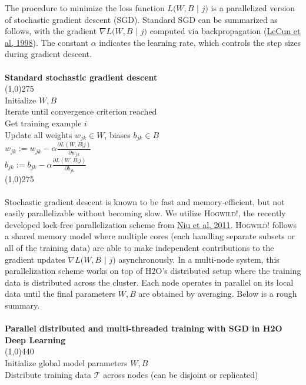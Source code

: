 \documentclass{article}[11pt]
\begin{document}
The procedure to minimize the loss function $L(W,B$ $|$ $j)$ is a parallelized version of stochastic gradient descent (SGD). Standard SGD can be summarized as follows, with the gradient $\nabla L(W,B$ $|$ $j)$ computed via backpropagation (\href{http://yann.lecun.com/exdb/publis/pdf/lecun-98b.pdf}{LeCun et al, 1998}). The constant $\alpha$ indicates the learning rate, which controls the step sizes during gradient descent.
\\
\\
{\bf{\footnotesize{Standard stochastic gradient descent}}}
\\
\line(1,0){275}
\\
Initialize $W,B$ 
\\
Iterate until convergence criterion reached
\\
\indent Get training example $i$
\\
\indent Update all weights $w_{jk} \in W$, biases $b_{jk} \in B$
\\
\indent \indent $w_{jk} := w_{jk} - \alpha \frac{\partial L(W,B | j)}{\partial w_{jk}}$
\\
\indent \indent $b_{jk} := b_{jk} - \alpha \frac{\partial L(W,B | j)}{\partial b_{jk}}$
\\
\line(1,0){275}
\\
\\
Stochastic gradient descent is known to be fast and memory-efficient, but not easily parallelizable without becoming slow. We utilize \textsc{Hogwild!}, the recently developed lock-free parallelization scheme from \href{http://i.stanford.edu/hazy/papers/hogwild-nips.pdf}{Niu et al, 2011}. \textsc{Hogwild!} follows a shared memory model where multiple cores  (each handling separate subsets or all of the training data) are able to make independent contributions to the gradient updates $\nabla L(W,B$ $ |$ $j)$ asynchronously. In a multi-node system, this parallelization scheme works on top of H2O's distributed setup where the training data is distributed across the cluster. Each node operates in parallel on its local data until the final parameters $W,B$ are obtained by averaging. Below is a rough summary.
\\
\\
\noindent
{\bf{\footnotesize{Parallel distributed and multi-threaded training with SGD in H2O Deep Learning}}}
\\
\line(1,0){440}
\\
Initialize global model parameters $W,B$
\\
Distribute training data $\mathcal{T}$ across nodes (can be disjoint or replicated)
\end{document}

